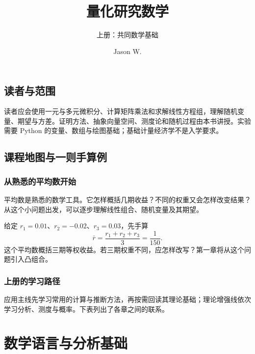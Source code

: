 \documentclass[lang=cn,11pt,scheme=chinese]{elegantbook}
\title{量化研究数学}
\subtitle{上册：共同数学基础}
\author{Jason W.}
\date{\MFQReleaseDate}
\begin{document}
\maketitle
\frontmatter

\chapter*{读者与范围}
读者应会使用一元与多元微积分、计算矩阵乘法和求解线性方程组，理解随机变量、期望与方差。证明方法、抽象向量空间、测度论和随机过程由本书讲授。实验需要 Python 的变量、数组与绘图基础；基础计量经济学不是入学要求。



\tableofcontents
\mainmatter

\chapter*{课程地图与一则手算例}

\section{从熟悉的平均数开始}

平均数是熟悉的数学工具。它怎样概括几期收益？不同的权重又会怎样改变结果？从这个小问题出发，可以逐步理解线性组合、随机变量及其期望。

\begin{example}
给定 $r_1=0.01$、$r_2=-0.02$、$r_3=0.03$，先手算
\[
  \bar r=\frac{r_1+r_2+r_3}{3}=\frac{1}{150}.
\]
这个平均数概括三期等权收益。若三期权重不同，应怎样改写？第一章将从这个问题引入凸组合。
\end{example}

\section{上册的学习路径}

应用主线先学习常用的计算与推断方法，再按需回读其理论基础；理论增强线依次学习分析、测度与概率。下表列出了各章之间的联系。



\part{数学语言与分析基础}




\end{document}
